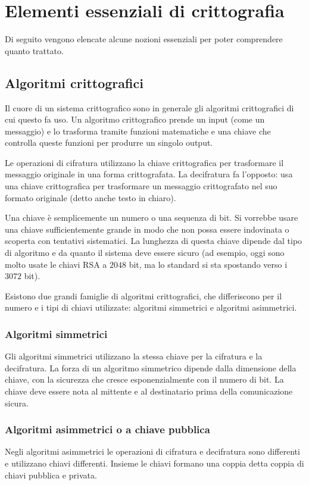 \section{Elementi essenziali di crittografia}\label{sec:crittografia}
Di seguito vengono elencate alcune nozioni essenziali per poter comprendere quanto trattato.

\subsection{Algoritmi crittografici}\label{subsec:algoritmi_crittografici}
Il cuore di un sistema crittografico sono in generale gli algoritmi crittografici di cui questo fa uso. Un algoritmo crittografico prende un input (come un messaggio) e lo trasforma tramite funzioni matematiche e una chiave che controlla queste funzioni per produrre un singolo output.

Le operazioni di cifratura utilizzano la chiave crittografica per trasformare il messaggio originale in una forma crittografata. La decifratura fa l'opposto: usa una chiave crittografica per trasformare un messaggio crittografato nel suo formato originale (detto anche testo in chiaro). 

Una chiave è semplicemente un numero o una sequenza di bit. Si vorrebbe usare una chiave sufficientemente grande in modo che non possa essere indovinata o scoperta con tentativi sistematici. La lunghezza di questa chiave dipende dal tipo di algoritmo e da quanto il sistema deve essere sicuro (ad esempio, oggi sono molto usate le chiavi RSA a $2048$ bit, ma lo standard si sta spostando verso i $3072$ bit).

Esistono due grandi famiglie di algoritmi crittografici, che differiscono per il numero e i tipi di chiavi utilizzate: algoritmi simmetrici e algoritmi asimmetrici.

\subsubsection{Algoritmi simmetrici}\label{subsubsec:algoritmi_simmetrici}
Gli algoritmi simmetrici utilizzano la stessa chiave per la cifratura e la decifratura. La forza di un algoritmo simmetrico dipende dalla dimensione della chiave, con la sicurezza che cresce esponenzialmente con il numero di bit. La chiave deve essere nota al mittente e al destinatario prima della comunicazione sicura.

\subsubsection{Algoritmi asimmetrici o a chiave pubblica}\label{subsubsec:algoritmi_asimmetrici}
Negli algoritmi asimmetrici le operazioni di cifratura e decifratura sono differenti e utilizzano chiavi differenti. Insieme le chiavi formano una coppia detta coppia di chiavi pubblica e privata. 

